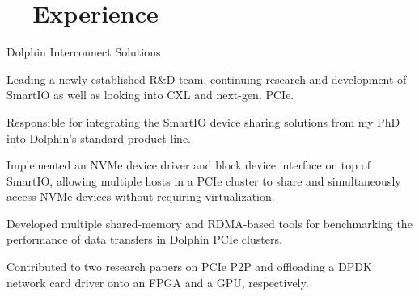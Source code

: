 \section[Experience]{\faBriefcase~~Experience}
\begin{experience}{Dolphin Interconnect Solutions}{
}
    \item{Leading a newly established R\&D team, continuing research and development of SmartIO as well as looking into CXL and next-gen. PCIe.}
    \item{Responsible for integrating the SmartIO device sharing solutions from my PhD into Dolphin's standard product line.}
    \item{Implemented an NVMe device driver and block device interface on top of SmartIO, allowing multiple hosts in a PCIe cluster to share and simultaneously access NVMe devices without requiring virtualization.} %
    \item{Developed multiple shared-memory and RDMA-based tools for benchmarking the performance of data transfers in Dolphin PCIe clusters.}
    \item{Contributed to two research papers on PCIe P2P and offloading a DPDK network card driver onto an FPGA and a GPU, respectively.}
\end{experience}

